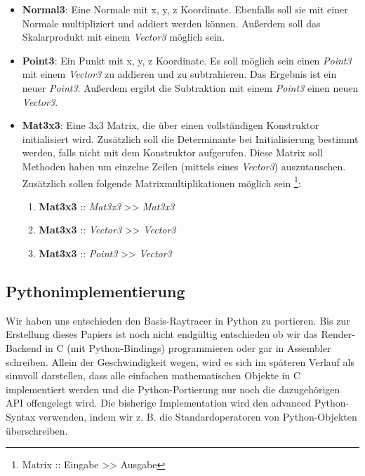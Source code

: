 \documentclass[tog]{acmsiggraph}
\begin{document}
\begin{itemize}
\item \textbf{Normal3}: Eine Normale mit x, y, z Koordinate. \newline
						Ebenfalls soll sie mit einer Normale multipliziert und addiert
						werden können. \newline Außerdem soll das Skalarprodukt mit einem
						\textit{Vector3} möglich sein.
\item \textbf{Point3}: Ein Punkt mit x, y, z Koordinate. \newline
						Es soll möglich sein einen \textit{Point3} mit einem
						\textit{Vector3} zu addieren und zu subtrahieren. Das
						Ergebnis ist ein neuer \textit{Point3}. \newline Außerdem ergibt
						die Subtraktion mit einem \textit{Point3} einen neuen
						\textit{Vector3}.
\item \textbf{Mat3x3}: Eine 3x3 Matrix, die über einen vollständigen Konstruktor
						initialisiert wird. Zusätzlich soll die Determinante bei
						Initialisierung bestimmt werden, falls nicht mit dem Konstruktor
						aufgerufen.
						\newline Diese Matrix soll Methoden haben um einzelne
						Zeilen (mittels eines \textit{Vector3}) auszutauschen. \newline
						Zusätzlich sollen folgende Matrixmultiplikationen möglich sein
						\footnote{Matrix :: Eingabe >> Ausgabe}:
						\begin{enumerate}
						\item \textbf{Mat3x3} :: \textit{Mat3x3} >> \textit{Mat3x3}
						\item \textbf{Mat3x3} :: \textit{Vector3} >> \textit{Vector3}
						\item \textbf{Mat3x3} :: \textit{Point3} >> \textit{Vector3}
						\end{enumerate}
\end{itemize}

\subsection{Pythonimplementierung}

Wir haben uns entschieden den Basis-Raytracer in Python zu portieren. Bis zur Erstellung dieses Papiers ist noch nicht endgültig entschieden ob wir das Render-Backend in C (mit Python-Bindings) programmieren oder gar in Assembler schreiben. Allein der Geschwindigkeit wegen, wird es sich im späteren Verlauf als sinnvoll darstellen, dass alle einfachen mathematischen Objekte in C implementiert werden und die Python-Portierung nur noch die dazugehörigen API offengelegt wird. \newline
Die bisherige Implementation wird den advanced Python-Syntax verwenden, indem wir z. B. die Standardoperatoren von Python-Objekten überschreiben. \newline
\end{document}
